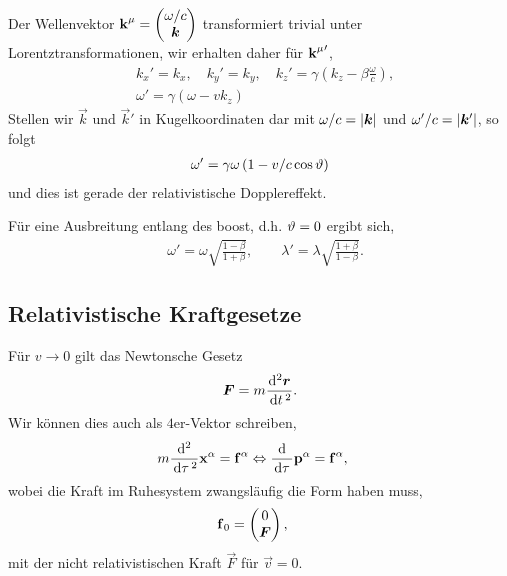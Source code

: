 Der Wellenvektor $\bm{\mathrm{k}}^\mu = \begin{pmatrix}\omega/c\\\bm{k}\end{pmatrix}$
transformiert trivial unter Lorentztransformationen, wir erhalten daher für ${\bm{\mathrm{k}}^\mu}'$,
\begin{align*}
&k_x' = k_x,\quad
k_y' = k_y,\quad
k_z' = \gamma\left(k_z - \beta\frac{\omega}{c}\right),\\
&\omega' = \gamma\left(\omega - vk_z\right)
\end{align*}
Stellen wir $\vec{k}$ und $\vec{k}'$ in Kugelkoordinaten dar mit $\omega/c =
\left|\bm{k}\right|$ und $\omega'/c = \left|\bm{k}'\right|$, so folgt
\begin{align*}
\omega' = \gamma\omega\left(1-v/c\cos\vartheta\right)
\end{align*}
und dies ist gerade der relativistische Dopplereffekt.

Für eine Ausbreitung entlang des boost, d.h. $\vartheta = 0$ ergibt sich,
\begin{align*}
&\omega' = \omega\sqrt{\frac{1-\beta}{1+\beta}},\qquad\lambda' =
\lambda\sqrt{\frac{1+\beta}{1-\beta}}.
\end{align*}
% 



\subsection{Relativistische Kraftgesetze}

Für $v\to 0$ gilt das Newtonsche Gesetz
\begin{align*}
\bm{F} = m\frac{\mathrm{d}^2\bm{r}}{\,\mathrm{d} t\,^2}.
\end{align*}
Wir können dies auch als $4$er-Vektor schreiben,
\begin{align*}
&m\frac{\mathrm{d}^2 }{\,\mathrm{d} \tau\,^2} \bm{\mathrm{x}}^\alpha= \bm{\mathrm{f}}^\alpha \Leftrightarrow
\frac{\mathrm{d}}{\,\mathrm{d} \tau\,} \bm{\mathrm{p}}^\alpha= \bm{\mathrm{f}}^\alpha,
\end{align*}
wobei die Kraft im Ruhesystem zwangsläufig die Form haben muss,
\begin{align*}
&\bm{\mathrm{f}}_0 = \begin{pmatrix}0\\\bm{F}\end{pmatrix},
\end{align*}
mit der nicht relativistischen Kraft $\vec{F}$ für $\vec{v} = 0$.

